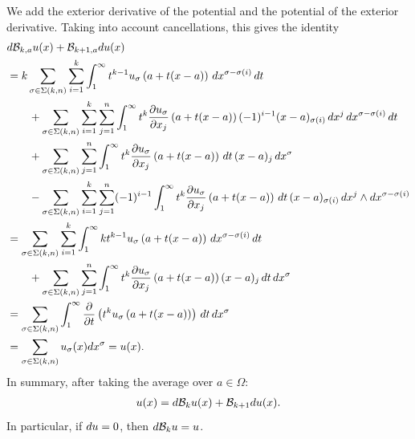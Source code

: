 \documentclass[10pt,a4paper]{article}
\begin{document}
We add the exterior derivative of the potential and the potential of the exterior derivative.
Taking into account cancellations, this gives the identity 
\begin{align*}
    &
    d {\mathcal B}_{k,a} u(x)
    +
    {\mathcal B}_{k+1,a} d u(x)
    \\&
    =
    k
    \sum_{\sigma \in \Sigma(k,n)} \sum_{i=1}^{k}
    \int_{1}^\infty 
    t^{k-1} u_{\sigma}\left(a+t(x-a)\right) \,dx^{\sigma-\sigma(i)} \,dt 
    \\&\qquad
    + 
    \sum_{\sigma \in \Sigma(k,n)} \sum_{i=1}^{k} \sum_{j=1}^{n}
    \int_{1}^\infty 
    t^{k} \frac{ \partial u_{\sigma} }{\partial x_{j}}\left(a+t(x-a)\right) (-1)^{i-1} (x-a)_{\sigma(i) } \,dx^{j} \,dx^{\sigma-\sigma(i)} \,dt 
    \\&\qquad
    +
    \sum_{\sigma \in \Sigma(k,n)} \sum_{j=1}^{n}
    \int_{1}^\infty t^{k} \frac{ \partial u_{\sigma} }{\partial x_{j}}\left(a+t(x-a)\right) \,dt \,(x-a)_{j} \,dx^{\sigma}
    \\&\qquad
    - 
    \sum_{\sigma \in \Sigma(k,n)} \sum_{i=1}^{k} \sum_{j=1}^{n}
    (-1)^{i-1}
    \int_{1}^\infty t^{k} \frac{ \partial u_{\sigma} }{\partial x_{j}}\left(a+t(x-a)\right) \,dt 
    \,(x-a)_{\sigma(i)} \,dx^{j} \wedge dx^{\sigma-\sigma(i)}
    \\&
    =
    \sum_{\sigma \in \Sigma(k,n)} \sum_{i=1}^{k}
    \int_{1}^\infty 
    k t^{k-1} u_{\sigma}\left(a+t(x-a)\right) \,dx^{\sigma-\sigma(i)} \,dt 
    \\&\qquad
    +
    \sum_{\sigma \in \Sigma(k,n)} \sum_{j=1}^{n}
    \int_{1}^\infty t^{k} \frac{ \partial u_{\sigma} }{\partial x_{j}}\left(a+t(x-a)\right) (x-a)_{j} \,dt \,dx^{\sigma}
    \\&
    =
    \sum_{\sigma \in \Sigma(k,n)} 
    \int_{1}^\infty \frac{\partial}{\partial t} \left( t^{k} u_{\sigma}\left(a+t(x-a)\right) \right) \,dt \,dx^{\sigma}
    \\&
    =
    \sum_{\sigma \in \Sigma(k,n)} 
    u_{\sigma}(x) dx^{\sigma}
    =
    u(x)
    .
\end{align*}
In summary, after taking the average over $a \in \Omega$:
\begin{align*}
    u(x) = d {\mathcal B}_{k} u(x) + {\mathcal B}_{k+1} d u(x)
    .
\end{align*}
In particular, if $d u = 0$, then $d {\mathcal B}_{k} u = u$.
\\
\end{document}
